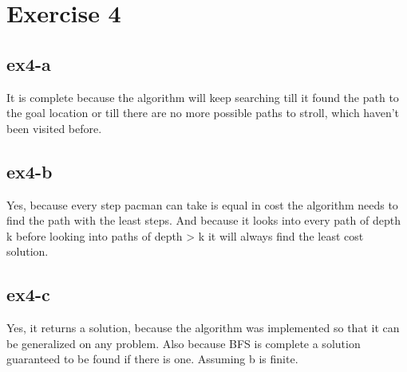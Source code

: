 \section{Exercise 4}
\subsection{ex4-a}
It is complete because the algorithm will keep searching till it found the path to the goal location or till there are no more
possible paths to stroll, which haven't been visited before.

\subsection{ex4-b}
Yes, because every step pacman can take is equal in cost the algorithm needs to find the path with the least steps.
And because it looks into every path of depth k before looking into paths of depth > k it will
always find the least cost solution.

\subsection{ex4-c}
Yes, it returns a solution, because the algorithm was implemented so that it can be generalized on any problem. Also because BFS is complete a solution guaranteed to be found if there is one. Assuming b is finite.